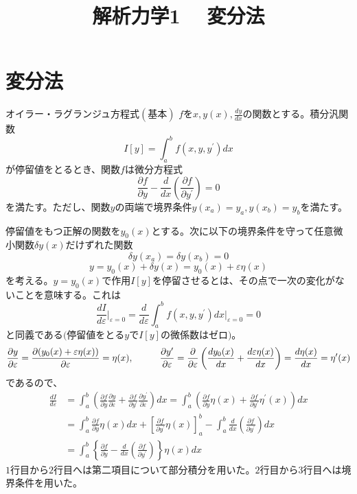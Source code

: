 \documentclass{jsarticle}
\title{解析力学1 　変分法}
\author{}
\date{}
\begin{document}
\maketitle
\noindent
\section{変分法}
\noindent
\begin{itembox}[l]{オイラー・ラグランジュ方程式\((基本)\)}
\(f\)を\(x,y(x),\frac{dy}{dx}\)の関数とする。積分汎関数
\[I[y]=\int_{a}^{b}f(x,y,y^{\prime})dx\]
が停留値をとるとき、関数\(f\)は微分方程式
\[\frac{\partial f}{\partial y}-\frac{d}{dx}\left(\frac{\partial f}{\partial y^{\prime}}\right)=0\]
を満たす。ただし、関数\(y\)の両端で境界条件\(y(x_{a})=y_{a},y(x_{b})=y_{b}\)を満たす。
\end{itembox}
停留値をもつ正解の関数を\(y_{0}(x)\)とする。次に以下の境界条件を守って任意微小関数\(\delta y(x)\)だけずれた関数
\[\delta y(x_{a})=\delta y(x_{b})=0\]
\[y=y_{0}(x)+\delta y(x)=y_{0}(x)+\varepsilon\eta(x)\]
を考える。\(y=y_{0}(x)\)で作用\(I[y]\)を停留させるとは、その点で一次の変化がないことを意味する。これは
\[\frac{dI}{d\varepsilon}\Big|_{\varepsilon=0}=\frac{d}{d\varepsilon}\int_{a}^{b}f(x,y,y^{\prime})dx\Big|_{\varepsilon=0}=0\]
と同義である\((\)停留値をとる\(y\)で\(I[y]\)の微係数はゼロ\()\)。
\[\frac{\partial y}{\partial \varepsilon}=\frac{\partial(y_{0}(x)+\varepsilon\eta(x))}{\partial \varepsilon}=\eta(x),\hspace{10mm}\frac{\partial y^{\prime}}{\partial \varepsilon}=\frac{\partial}{\partial\varepsilon}\left(\frac{d y_{0}(x)}{dx}+\frac{d\varepsilon\eta(x)}{dx}\right)=\frac{d\eta(x)}{dx}=\eta^{\prime}(x)\]
であるので、
\begin{align*}
\frac{dI}{d\varepsilon}&=\int_{a}^{b}\left(\frac{\partial f}{\partial y}\frac{\partial y}{\partial\varepsilon}+\frac{\partial f}{\partial y^{\prime}}\frac{\partial y^{\prime}}{\partial\varepsilon}\right)dx=\int_{a}^{b}\left(\frac{\partial f}{\partial y}\eta(x)+\frac{\partial f}{\partial y^{\prime}}\eta^{\prime}(x)\right)dx\\
&=\int_{a}^{b}\frac{\partial f}{\partial y}\eta(x)dx+\left[\frac{\partial f}{\partial y^{\prime}}\eta(x)\right]_{a}^{b}-\int_{a}^{b}\frac{d}{dx}\left(\frac{\partial f}{\partial y^{\prime}}\right)dx\\
&=\int_{a}^{b}\left\{\frac{\partial f}{\partial y}-\frac{d}{dx}\left(\frac{\partial f}{\partial y^{\prime}}\right)\right\}\eta(x)dx
\end{align*}
\(1\)行目から\(2\)行目へは第二項目について部分積分を用いた。\(2\)行目から\(3\)行目へは境界条件を用いた。\\
\end{document}

